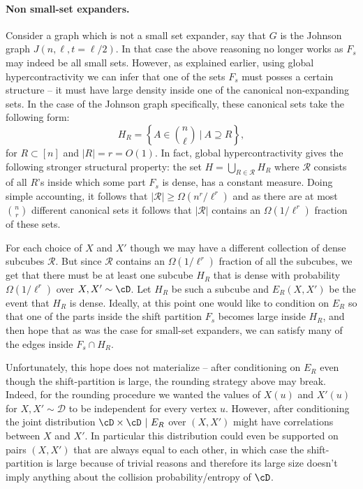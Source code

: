 \paragraph{Non small-set expanders.} Consider a graph which is 
not a small set expander, say that $G$ is the Johnson graph $J(n,\ell,t=\ell/2)$. In that case the above reasoning no longer 
works as $F_s$ may indeed be all small sets. However, as explained 
earlier, using global hypercontractivity we can infer that one of the sets $F_s$ must posses a 
certain structure -- it must have large density inside one of the canonical non-expanding sets.
In the case of the Johnson graph specifically, these canonical sets take the following form:
\[
H_R = \left\{A\in\binom{n}{\ell}~\Big|~A\supseteq R\right\},
\]
for $R \subset [n]$ and $|R| = r = O(1)$. In fact, global hypercontractivity gives the following stronger structural property: the set $H = \bigcup_{R\in\mathcal{R}} H_R$ where $\mathcal{R}$ 
consists of all $R$'s inside which some part $F_s$ is dense, 
has a constant measure. Doing simple accounting, it follows that $|\mathcal{R}|\geq \Omega(n^r/\ell^r)$
and as there are at most $\binom{n}{r}$ different canonical sets it follows that $|\mathcal{R}|$ contains an
$\Omega(1/\ell^r)$ fraction of these sets.

For each choice of $X$ and $X'$ though 
we may have a different collection of dense subcubes $\mathcal{R}$. But since $\mathcal{R}$ contains an $\Omega(1/\ell^r)$ fraction of all the subcubes, we get that there must be at least one subcube $H_R$ that is dense with probability $\Omega(1/\ell^r)$ over $X,X' \sim \cD$. Let $H_R$ be such a subcube and $E_R(X,X')$ be the event that $H_R$ is dense. Ideally, at this point one would like to condition on $E_R$ so that one of the parts inside the shift partition $F_s$ becomes large inside $H_R$, and then hope that as was the case for small-set expanders, we can satisfy many of the edges inside $F_s\cap H_R$. 



Unfortunately, this hope does not materialize -- after conditioning on $E_R$ even though the shift-partition is large, the rounding strategy above may break. Indeed, 
for the rounding procedure we wanted the values of $X(u)$ and $X'(u)$ for $X,X'\sim\mathcal{D}$ to be independent 
for every vertex $u$. However, after conditioning the joint distribution $\cD \times \cD ~|~E_R$ over $(X,X')$ might have correlations between $X$ and $X'$. In particular this distribution could even be supported on pairs $(X,X')$ that are always equal to each other, in which case the shift-partition is large because of trivial reasons and therefore its large size doesn't imply anything about the collision probability/entropy of $\cD$. 

